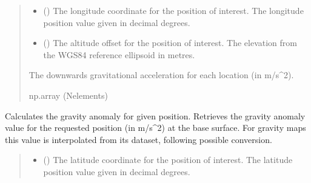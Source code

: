 \documentclass[letterpaper,10pt,english]{sphinxmanual}
\begin{document}
\begin{fulllineitems}
\begin{fulllineitems}
\begin{quote}
\begin{description}
\begin{itemize}
\item {} 
\sphinxAtStartPar
{} () \textendash{} The longitude coordinate for the position of interest.
The longitude position value given in decimal degrees.

\item {} 
\sphinxAtStartPar
{} () \textendash{} The altitude offset for the position of interest.
The elevation from the WGS\sphinxhyphen{}84 reference ellipsoid in metres.

\end{itemize}

\sphinxAtStartPar
The downwards gravitational acceleration for each location
(in m/s\textasciicircum{}2).

\sphinxAtStartPar
np.array (N\sphinxhyphen{}elements)

\end{description}\end{quote}

\end{fulllineitems}


\begin{fulllineitems}
\label{\detokenize{modules/gravity/ggm_plus:qnav.gravity.ggm_plus.GGMPlusAcc.get_anomaly}}
\pysigstartsignatures
{}
\pysigstopsignatures
\sphinxAtStartPar
Calculates the gravity anomaly for given position.
Retrieves the gravity anomaly value for the requested position
(in m/s\textasciicircum{}2) at the base surface. For gravity maps this value is
interpolated from its dataset, following possible conversion.
\begin{quote}\begin{description}
\begin{itemize}
\item {} 
\sphinxAtStartPar
{} () \textendash{} The latitude coordinate for the position of interest.
The latitude position value given in decimal degrees.


\end{itemize}
\end{description}
\end{quote}
\end{fulllineitems}
\end{fulllineitems}
\end{document}
